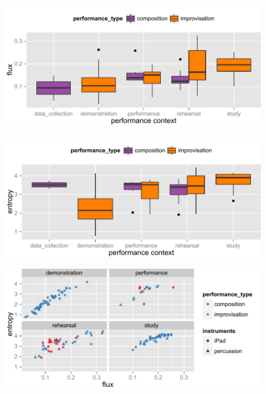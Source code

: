 \documentclass{sigchi}
\begin{document}
\begin{figure}
  \centering
  \includegraphics[width=\linewidth]{figures/flux-boxplot}
  \caption{
    \label{fig:flux-boxplot}}
\end{figure}

\begin{figure}
  \centering
  \includegraphics[width=\linewidth]{figures/entropy-boxplot}
  \caption{
    \label{fig:entropy-boxplot}}
\end{figure}

\begin{figure}
  \centering
  \includegraphics[width=\linewidth]{figures/flux-entropy-distribution}
  \caption{
    \label{fig:flux-entropy-distribution}}
\end{figure}
\end{document}

